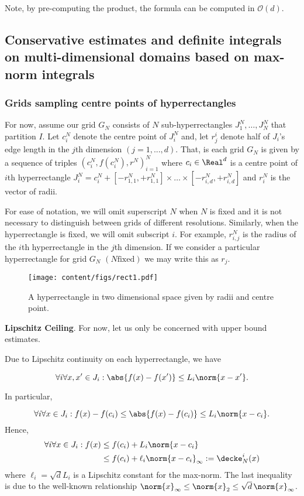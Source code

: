 \begin{rem}
Note, by pre-computing the product, the formula can be computed in $\mathcal O(d )$.
\end{rem}

\subsection{Conservative estimates and definite integrals on multi-dimensional domains based on max-norm integrals}

\subsubsection{Grids sampling centre points of hyperrectangles }
 For now, assume our grid $G_N$ consists of $N$ sub-hyperrectangles $J_1^N,\ldots,J_N^N$ that partition $I$. Let $c_i^N$ denote the centre point of $J_i^N$ and, let $r_j^i$ denote half of $J_i$'s edge length in the $j$th dimension $(j=1,...,d)$. 
That, is each grid $G_N$ is given by a sequence of triples $(c_i^N, f(c_i^N), r^N)_{i=1}^N$ where $c_i \in \Real^d$ is a centre point of $i$th hyperrectangle $J_i^N = c_i^N + [-r_{1,1}^N,+r_{1,1}^N] \times \ldots \times  [-r_{i,d}^N,+r_{i,d}^N] $ and $r_i^N$ is the vector of radii.  

For ease of notation, we will omit superscript $N$ when $N$ is fixed and it is not necessary to distinguish between 
grids of different resolutions. Similarly, when the hyperrectangle is fixed, we will omit subscript $i$. For example, $r_{i,j}^N$ is the radius of the $i$th hyperrectangle in the $j$th dimension. If we consider a particular hyperrectangle for grid $G_N$ $(N \text{fixed})$ we may write this as $r_j$.

\begin{figure}[htbp]
			\centering
			\texttt{[image: content/figs/rect1.pdf]}
	\caption{A hyperrectangle in two dimensional space given by radii and centre point.}
	\label{fig:rect1}
\end{figure}


\textbf{Lipschitz Ceiling}. For now, let us only be concerned with upper bound estimates. 

Due to Lipschitz continuity on each hyperrectangle, we have 


\[\forall i \forall x,x' \in J_i: \abs{f(x) - f(x')} \leq L_i \norm{x-x'}. \]

In particular, 

\[\forall i \forall x \in J_i: f(x) - f(c_i) \leq\abs{f(x) - f(c_i)} \leq L_i \norm{x-c_i}. \]
Hence, 
\begin{align}
\forall i \forall x \in J_i: f(x)  &\leq f(c_i) + L_i \norm{x-c_i} \\
&\leq f(c_i) + \ell_i \norm{x-c_i}_{\infty}:= \decke^i_N(x)
\end{align}
where $\ell_i = \sqrt d L_i$ is a Lipschitz constant for the max-norm.
The last inequality is due to the well-known relationship 
$\norm{x}_\infty \leq \norm{x}_2 \leq \sqrt{d} \, \norm{x}_\infty $.

